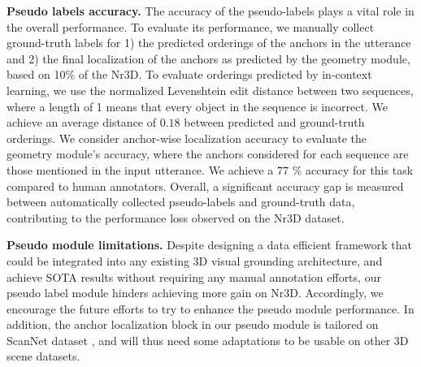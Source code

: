 

\noindent \textbf{Pseudo labels accuracy.} 
The accuracy of the pseudo-labels plays a vital role in the overall performance.
To evaluate its performance, we manually collect ground-truth labels for 1) the predicted orderings of the anchors in the utterance and 2) the final localization of the anchors as predicted by the geometry module, based on 10\% of the Nr3D.
To evaluate orderings predicted by in-context learning, we use the normalized Levenshtein edit distance between two sequences, where a length of 1 means that every object in the sequence is incorrect. We achieve an average distance of $0.18$ between predicted and ground-truth orderings.
We consider anchor-wise localization accuracy to evaluate the geometry module's accuracy, where the anchors considered for each sequence are those mentioned in the input utterance. 
We achieve a $77$ \% accuracy for this task compared to human annotators.
Overall, a significant accuracy gap is measured between automatically collected pseudo-labels and ground-truth data, contributing to the performance loss observed on the Nr3D dataset.


\noindent \textbf{Pseudo module limitations.}
Despite designing a data efficient framework that could be integrated into any existing 3D visual grounding architecture, and achieve SOTA results without requiring any manual annotation efforts, our pseudo label module hinders achieving more gain on Nr3D.
Accordingly, we encourage the future efforts to try to enhance the pseudo module performance.
In addition, the anchor localization block in our pseudo module is tailored on ScanNet dataset \citep{dai2017scannet}, and will thus need some adaptations to be usable on other 3D scene datasets.


